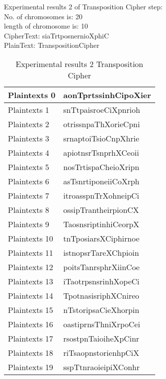 \textsf{Experimental results 2 of Transposition Cipher step:}\\
    \colorbox{blue!30}{\textsf{     No. of chromosomes is: 20}}\\
    \colorbox{blue!30}{\textsf{     length of chromosome is: 10}}\\
    \colorbox{blue!30}{\textsf{     CipherText: siaTrtposnernioXphiC}}\\
    \colorbox{blue!30}{\textsf{     PlainText: TranspositionCipher}}
\begin{table}[H]
\centering
\begin{tabular}{l l}\hline
    Plaintexts 0&aonTprtssinhCipoXier\\ \hline
    Plaintexts 1&snTtpaisroeCiXpnrioh\\ \hline
    Plaintexts 2&otrissnpaThXorieCpni\\ \hline
    Plaintexts 3&srnaptoiTsioCnpXhrie\\ \hline
    Plaintexts 4&apiotnsrTsnprhXCeoii\\ \hline
    Plaintexts 5&nosTrtispaCheioXripn\\ \hline
    Plaintexts 6&asTsnrtiponeiiCoXrph\\ \hline
    Plaintexts 7&itroasspnTrXohneipCi\\ \hline
    Plaintexts 8&ossipTrantheirpionCX\\ \hline
    Plaintexts 9&TaosnsriptinhiCeorpX\\ \hline
    Plaintexts 10&tnTposiarsXCiphirnoe\\ \hline
    Plaintexts 11&istnopsrTareXChpioin\\ \hline
    Plaintexts 12&poitsTanrsphrXiinCoe\\ \hline
    Plaintexts 13&iTaotrpsnsrinhXopeCi\\ \hline
    Plaintexts 14&TpotnasisriphXCnireo\\ \hline
    Plaintexts 15&nTstoripsaCieXhorpin\\ \hline
    Plaintexts 16&oastiprnsThniXrpoCei\\ \hline
    Plaintexts 17&rsostpnTaioiheXpCinr\\ \hline
    Plaintexts 18&riTsaopnstorienhpCiX\\ \hline
    Plaintexts 19&sspTtnraoieipiXConhr\\ \hline
\end{tabular}
\caption{Experimental results 2 Transposition Cipher}

\end{table}